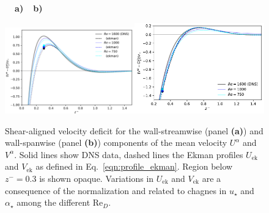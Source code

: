\documentclass[smallcondensed,final]{svjour3}
\newcommand{\RE}{\mathrm{Re}}
\begin{document}
\begin{figure}
  \begin{flushleft}
    \textbf{\ \ a)}\hspace{0.45\textwidth}\textbf{\ \ b)}\\
  \end{flushleft} 
  \includegraphics[width=0.5\textwidth]{../plot/outer_layer_u.pdf}\includegraphics[width=0.5\textwidth]{../plot/outer_layer_w.pdf}
  \caption{
    \label{fig:profiles_outer}
    Shear-aligned velocity deficit for the wall-streamwise (panel \textbf{(a)}) and wall-spanwise (panel \textbf{(b)})
    components of the mean velocity $U^\alpha$ and $V^\alpha$.
    Solid lines show DNS data, dashed lines the Ekman profiles $U_\mathrm{ek}$ and $V_\mathrm{ek}$ as defined in
    Eq.~\ref{eqn:profile_ekman}. Region below $z^-=0.3$ is shown opaque. Variations in $U_\mathrm{ek}$ and $V_\mathrm{ek}$ are
    a consequence of the normalization and related to chagnes in $u_\star$ and $\alpha_\star$ among the different $\RE_D$. 
  }
\end{figure}
\end{document}
